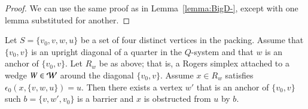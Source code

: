 \begin{proof}  We can use the same proof as in Lemma~\ref{lemma:BigD-},
except with one lemma substituted for 
another.
\end{proof}

\begin{lemma}\label{lemma:fine:barrier}  
Let $S=\{v_0,v,w,u\}$ be a set of four distinct vertices
in the packing.  Assume that $\{v_0,v\}$ is an upright diagonal of
a quarter in the $Q$-system and that $w$ is an anchor of $\{v_0,v\}$.
Let $R_w$ be as above; that is, a Rogers simplex attached to a wedge
$W\in {\mathcal W}$ around the diagonal $\{v_0,v\}$.
Assume $x\in R_w$ satisfies $\epsilon_0(x,\{v,w,u\})= u$.
Then there exists a vertex $w'$ that is an anchor of $\{v_0,v\}$ such
$b=\{v,w',v_0\}$ is a barrier and $x$ is obstructed from $u$
by $b$.
\end{lemma}

